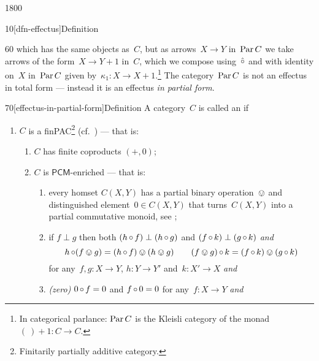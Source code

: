 \begin{parsec}{1800}
\begin{point}{10}[dfn-effectus]{Definition}
\begin{point}{60}
    which has the same objects
    as~$C$, but as arrows~$X \to Y$ in~$\operatorname{Par} C$
    we take arrows of the form~$X \to Y+1$ in~$C$,
    which we compose using~$\mathop{\hat\circ}$
    and with identity on~$X$ in~$\operatorname{Par} C$
    given by~$\kappa_1 \colon X \to X+1$.\footnote{In categorical
            parlance: $\operatorname{Par} C$ is the Kleisli category of
            the monad~$(\ )+1\colon C \to C$.}
The category~$\operatorname{Par} C$ is not an effectus in total form --- instead it
    is an effectus \emph{in partial form}.
\end{point}
\end{point}
\begin{point}{70}[effectus-in-partial-form]{Definition}%
A category~$C$ is called an 
    \cite{effintro,kentapartial} if
\begin{enumerate}
\item
    $C$ is a finPAC\footnote{Finitarily partially additive category.} \cite{kentapartial} (cf.~\cite{arbib}) --- that is:
    \begin{enumerate}
        \item 
            $C$ has finite coproducts $(+,0)$;
        \item $C$ is $\mathsf{PCM}$-enriched --- that is:
            \begin{enumerate}
            \item
            every homset $C(X,Y)$ has a partial binary operation~$\ovee$
                    and distinguished element~$0 \in C(X,Y)$
                    that turns~$C(X,Y)$ into a partial commutative monoid,
                    see ;
            \item
            if $f \perp g$ then both
                $(h \mathop{\circ} f) \perp (h \mathop{\circ} g)$ and
                $(f \mathop{\circ} k) \perp (g \mathop{\circ} k)$ \emph{and}
            \begin{equation*}
                 h \mathop{\circ} (f \ovee g) = 
                (h \mathop{\circ} f) \ovee (h \ovee g)\qquad
                (f \ovee g) \mathop{\circ} k = 
                (f \mathop{\circ} k) \ovee (g \mathop{\circ} k)
            \end{equation*}
                for any~$f,g \colon X \to Y$,
                $h\colon Y \to Y'$
                    and~$k \colon X'\to X$ \emph{and}
            \item
                \emph{(zero)}
                $0 \mathop{\circ} f = 0$ and $f \mathop{\circ} 0 = 0$ for
                    any~$f\colon X \to Y$ \emph{and}
            \end{enumerate}

\end{enumerate}
\end{enumerate}
\end{point}
\end{parsec}
